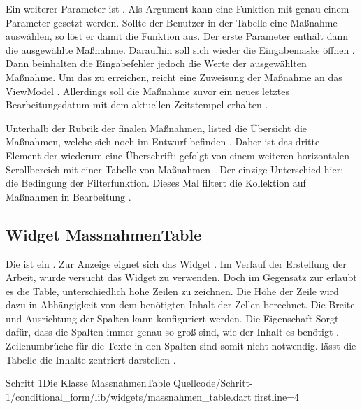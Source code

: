 Ein weiterer Parameter ist  . Als Argument kann eine Funktion mit genau einem Parameter gesetzt werden. Sollte der Benutzer in der Tabelle eine Maßnahme auswählen, so löst er damit die Funktion aus. Der erste Parameter enthält dann die ausgewählte Maßnahme. Daraufhin soll sich wieder die Eingabemaske öffnen . Dann beinhalten die Eingabefehler jedoch die Werte der ausgewählten Maßnahme.  Um das zu erreichen, reicht eine Zuweisung der Maßnahme an das ViewModel . Allerdings soll die Maßnahme zuvor ein neues letztes Bearbeitungsdatum mit dem aktuellen Zeitstempel erhalten .
 
Unterhalb der Rubrik der finalen Maßnahmen, listed die Übersicht die Maßnahmen, welche sich noch im Entwurf befinden . Daher ist das dritte Element der  wiederum eine Überschrift:   gefolgt von einem weiteren horizontalen Scrollbereich  mit einer Tabelle von Maßnahmen . Der einzige Unterschied hier: die Bedingung der Filterfunktion. Dieses Mal filtert die Kollektion auf Maßnahmen in Bearbeitung .
\clearpage


\subsection{Widget MassnahmenTable}

Die  ist ein   . Zur Anzeige eignet sich das Widget  . Im Verlauf der Erstellung der Arbeit, wurde versucht das Widget  zu verwenden. Doch im Gegensatz zur  erlaubt es die Table, unterschiedlich hohe Zeilen zu zeichnen. Die Höhe der Zeile wird dazu in Abhängigkeit von dem benötigten Inhalt der Zellen berechnet. Die Breite und Ausrichtung der Spalten kann konfiguriert werden. Die Eigenschaft  Sorgt dafür, dass die Spalten immer genau so groß sind, wie der Inhalt es benötigt .  Zeilenumbrüche für die Texte in den Spalten sind somit nicht notwendig. lässt die  Tabelle die Inhalte zentriert darstellen .

\begin{alexlisting}{Schritt 1}{Die Klasse MassnahmenTable}
  {Quellcode/Schritt-1/conditional_form/lib/widgets/massnahmen_table.dart}
  {firstline=4}
  \label{lst:Schritt1KlasseMassnahmenTable}
\end{alexlisting}

